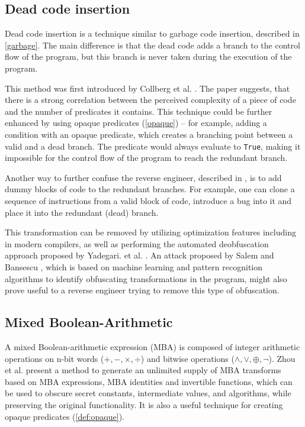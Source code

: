 \documentclass[
  digital, %
  notable,   %
  twoside, %
  nolof,     %
  nolot,     %
]{fithesis3}
\theoremstyle{definition}
\begin{document}
\subsection{Dead code insertion} \label{dead}
Dead code insertion is a technique similar to garbage code insertion, described in \ref{garbage}. The main difference is that the dead code adds a branch to the control flow of the program, but this branch is never taken during the execution of the program. 

This method was first introduced by Collberg et al. \cite{taxonomy_obf}. The paper suggests, that there is a strong correlation between the perceived complexity of a piece of code and the number of predicates it contains. This technique could be further enhanced by using opaque predicates (\ref{opaque}) -- for example, adding a condition with an opaque predicate, which creates a branching point between a valid and a dead branch. The predicate would always evaluate to \texttt{True}, making it impossible for the control flow of the program to reach the redundant branch. 

Another way to further confuse the reverse engineer, described in \cite{taxonomy_obf}, is to add dummy blocks of code to the redundant branches. For example, one can clone a sequence of instructions from a valid block of code, introduce a bug into it and place it into the redundant (dead) branch. 

This transformation can be removed by utilizing optimization features including in modern compilers, as well as performing the automated deobfuscation approach proposed by Yadegari. et al. \cite{generic_deobfuscation}. An attack proposed by Salem and Bansescu \cite{ml_deobfuscation}, which is based on machine learning and pattern recognition algorithms to identify obfuscating transformations in the program, might also prove useful to a reverse engineer trying to remove this type of obfuscation. 

\subsection{Mixed Boolean-Arithmetic} \label{mba}
A mixed Boolean-arithmetic expression (MBA) is composed of integer arithmetic operations on n-bit words ($+,-,\times, \div$) and bitwise operations ($\wedge, \vee, \oplus, \neg$). Zhou et al. \cite{mba_zhou} present a method to generate an unlimited supply of MBA transforms based on MBA expressions, MBA identities and invertible functions, which can be used to obscure secret constants, intermediate values, and algorithms, while preserving the original functionality. It is also a useful technique for creating opaque predicates (\ref{def:opaque}).
\end{document}
